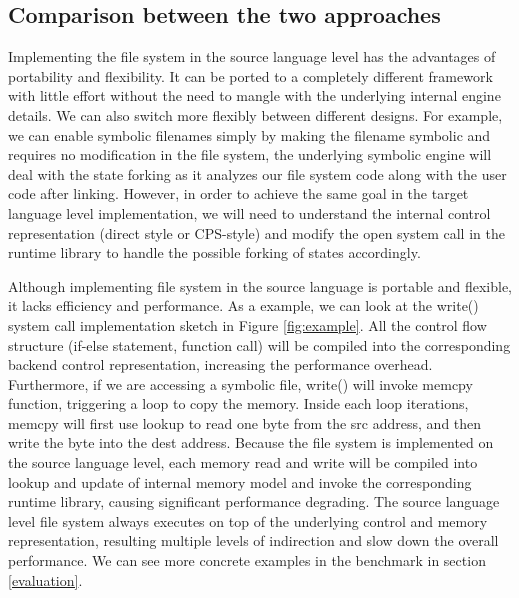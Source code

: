 \documentclass[sigplan, nonacm]{acmart}\settopmatter{printfolios=true,printccs=false,printacmref=false}
\begin{document}
\subsection*{Comparison between the two approaches}
Implementing the file system in the source language level has the advantages of portability and flexibility. It can be ported to a completely different framework with little effort without the need to mangle with the underlying internal engine details. We can also switch more flexibly  between different designs. For example, we can enable symbolic filenames simply by making the filename symbolic and requires no modification in the file system, the underlying symbolic engine will deal with the state forking as it analyzes our file system code along with the user code after linking. However, in order to achieve the same goal in the target language level implementation, we will need to understand the internal control representation (direct style or CPS-style) and modify the open system call in the runtime library to handle the possible forking of states accordingly.\par
Although implementing file system in the source language is portable and flexible, it lacks efficiency and performance. As a example, we can look at the write() system call implementation sketch in Figure \ref{fig:example}. All the control flow structure (if-else statement, function call) will be compiled into the corresponding backend control representation, increasing the performance overhead. Furthermore, if we are accessing a symbolic file, write() will invoke memcpy function, triggering a loop to copy the memory. Inside each loop iterations, memcpy will first use lookup to read one byte from the src address, and then write the byte into the dest address. Because the file system is implemented on the source language level, each memory read and write will be compiled into lookup and update of internal memory model and invoke the corresponding runtime library, causing significant performance degrading. The source language level file system always executes on top of the underlying control and memory representation, resulting multiple levels of indirection and slow down the overall performance. We can see more concrete examples in the benchmark in section \ref{evaluation}.
\end{document}
